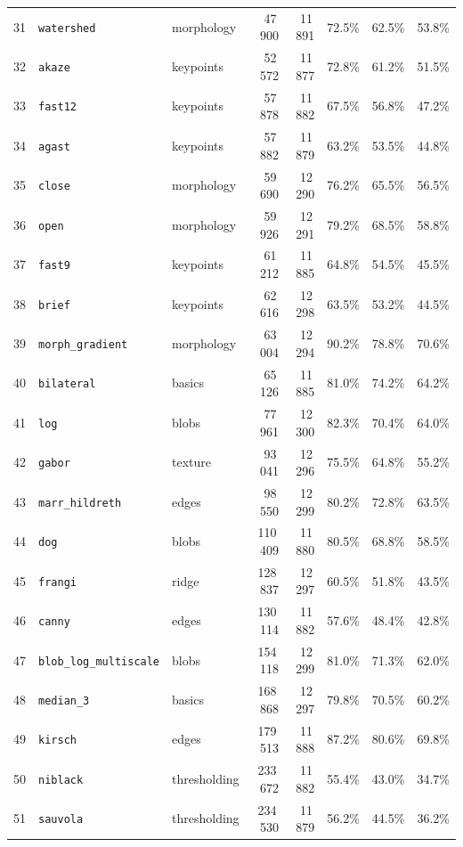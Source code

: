 \documentclass[a4paper,12pt]{article}
\begin{document}
\begin{longtable}{@{}r l l r r c c c@{}}
	31 & \texttt{watershed}          & morphology  & 47\,900  & 11\,891 & 72.5\% & 62.5\% & 53.8\% \\
	32 & \texttt{akaze}              & keypoints   & 52\,572  & 11\,877 & 72.8\% & 61.2\% & 51.5\% \\
	33 & \texttt{fast12}             & keypoints   & 57\,878  & 11\,882 & 67.5\% & 56.8\% & 47.2\% \\
	34 & \texttt{agast}              & keypoints   & 57\,882  & 11\,879 & 63.2\% & 53.5\% & 44.8\% \\
	35 & \texttt{close}              & morphology  & 59\,690  & 12\,290 & 76.2\% & 65.5\% & 56.5\% \\
	36 & \texttt{open}               & morphology  & 59\,926  & 12\,291 & 79.2\% & 68.5\% & 58.8\% \\
	37 & \texttt{fast9}              & keypoints   & 61\,212  & 11\,885 & 64.8\% & 54.5\% & 45.5\% \\
	38 & \texttt{brief}              & keypoints   & 62\,616  & 12\,298 & 63.5\% & 53.2\% & 44.5\% \\
	39 & \texttt{morph\_gradient}    & morphology  & 63\,004  & 12\,294 & 90.2\% & 78.8\% & 70.6\% \\
	40 & \texttt{bilateral}          & basics      & 65\,126  & 11\,885 & 81.0\% & 74.2\% & 64.2\% \\
	41 & \texttt{log}                & blobs       & 77\,961  & 12\,300 & 82.3\% & 70.4\% & 64.0\% \\
	42 & \texttt{gabor}              & texture     & 93\,041  & 12\,296 & 75.5\% & 64.8\% & 55.2\% \\
	43 & \texttt{marr\_hildreth}     & edges       & 98\,550  & 12\,299 & 80.2\% & 72.8\% & 63.5\% \\
	44 & \texttt{dog}                & blobs       & 110\,409 & 11\,880 & 80.5\% & 68.8\% & 58.5\% \\
	45 & \texttt{frangi}             & ridge       & 128\,837 & 12\,297 & 60.5\% & 51.8\% & 43.5\% \\
	46 & \texttt{canny}              & edges       & 130\,114 & 11\,882 & 57.6\% & 48.4\% & 42.8\% \\
	47 & \texttt{blob\_log\_multiscale}& blobs     & 154\,118 & 12\,299 & 81.0\% & 71.3\% & 62.0\% \\
	48 & \texttt{median\_3}          & basics      & 168\,868 & 12\,297 & 79.8\% & 70.5\% & 60.2\% \\
	49 & \texttt{kirsch}             & edges       & 179\,513 & 11\,888 & 87.2\% & 80.6\% & 69.8\% \\
	50 & \texttt{niblack}            & thresholding& 233\,672 & 11\,882 & 55.4\% & 43.0\% & 34.7\% \\
	51 & \texttt{sauvola}            & thresholding& 234\,530 & 11\,879 & 56.2\% & 44.5\% & 36.2\% \\
\end{longtable}
\endgroup
\end{document}
